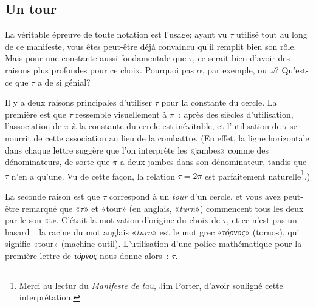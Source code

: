   \subsection{Un tour} %
  \label{sec:one_turn}

La véritable épreuve de toute notation est l'usage\ns; ayant vu $\tau$
utilisé tout au long de ce manifeste, vous êtes peut-être déjà convaincu qu'il
remplit bien son rôle. Mais pour une constante aussi fondamentale que $\tau$, ce
serait bien d'avoir des raisons plus profondes pour ce choix. Pourquoi pas
$\alpha$, par exemple, ou $\omega$\ns? Qu'est-ce que $\tau$ a de si génial\ns?

Il y a deux raisons principales d'utiliser $\tau$ pour la constante du cercle.
La première est que $\tau$ ressemble visuellement à $\pi$~: après des siècles
d'utilisation, l'association de $\pi$ à la constante du cercle est inévitable,
et l'utilisation de $\tau$ se nourrit de cette association au lieu de la
combattre. (En effet, la ligne horizontale dans chaque lettre suggère que l'on
interprète les «\ns jambes\ns » comme des dénominateurs, de sorte que $\pi$ a deux
jambes dans son dénominateur, tandis que $\tau$ n'en a qu'une. Vu de cette
façon, la relation $\tau = 2\pi$ est parfaitement naturelle\ns\footnote{Merci au
lectur du \emph{Manifeste de tau}, Jim Porter, d'avoir souligné cette
interprétation.}.)

La seconde raison est que $\tau$ correspond à un \emph{tour} d'un cercle, et
vous avez peut-être remarqué que «\ns $\tau$\ns » et «\ns tour\ns » (en anglais,
«\ns \emph{turn}\ns ») commencent tous les deux par le son «\ns t\ns ». C'était la
motivation d'origine du choix de $\tau$, et ce n'est pas un hasard~: la racine
du mot anglais «\ns \emph{turn}\ns » est le mot grec «\ns \emph{τόρνος}\ns » (tornos), qui signifie
«\ns tour\ns » (machine-outil). L'utilisation d'une
police mathématique pour la première lettre de \emph{τόρνος} nous donne alors~: $\tau$.

